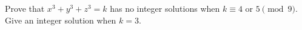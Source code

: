 Prove that $x^3+y^3+z^3=k$ has no integer solutions when $k\equiv4$ or $5\pmod9$. Give an integer solution when $k=3$.
